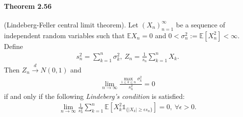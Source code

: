 \documentclass{article}
\numberwithin{equation}{section}
\newcommand{\E}{\mathbb{E}}
\renewcommand{\proofname}{\textit{Proof}}
\theoremstyle{plain}
\theoremstyle{definition}
\begin{document}
\paragraph{Theorem 2.56\label{thm:2.56}} (Lindeberg-Feller central limit theorem). Let $(X_n)_{n=1}^\infty$ be a sequence of independent random variables such that $\E X_n=0$ and $0<\sigma_n^2:=\E\left[X_n^2\right]<\infty$. Define
\begin{align*}
	s_n^2 = \sum_{k=1}^n \sigma_k^2,\ Z_n=\frac{1}{s_n}\sum_{k=1}^n X_k.
\end{align*}
Then $Z_n\overset{d}{\to}N(0,1)$ and
\begin{align*}
	\lim_{n\to\infty}\frac{\max_{1\leq k\leq n}\sigma_k^2}{s_n^2} = 0\tag{2.19}\label{eq:2.19}
\end{align*}
if and only if the following \textit{Lindeberg's condition} is satisfied:
\begin{align*}
	\lim_{n\to\infty}\frac{1}{s_n^2}\sum_{k=1}^n \E\left[X_k^2\mathds{1}_{\{\vert X_k\vert\geq\epsilon s_n\}}\right] = 0,\ \forall\epsilon>0.\tag{2.20}\label{eq:2.20}
\end{align*}
\renewcommand{\proofname}{Proof of Suffieiency}
\end{document}
